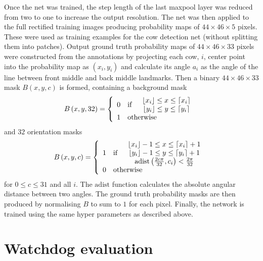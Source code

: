 \documentclass{IET}
\begin{document}
Once the net was trained, the step length of the last maxpool layer was reduced from two to one to increase the output resolution. The net was then applied to the full rectified training images producing probability maps of $44\times 46\times 5$ pixels. These were used as training examples for the cow detection net (without splitting them into patches). Output ground truth probability maps of $44\times 46\times 33$ pixels were constructed from the annotations by projecting each cow, $i$, center point into the probability map as $\left( x_i, y_i \right)$ and calculate its angle $a_i$ as the angle of the line between front middle and back middle landmarks. Then a binary $44\times 46\times 33$ mask $B\left( x, y, c \right)$ is formed, containing a background mask
\begin{equation}
B\left( x, y, 32 \right) = \left\lbrace
\begin{array}{clc}
0 & \text{if} &
\begin{array}{c}
 \lfloor x_i \rfloor \leq x \leq \lceil x_i \rceil \\
 \lfloor y_i \rfloor \leq y \leq \lceil y_i \rceil
\end{array}
\\
1 & \multicolumn{2}{l}{\text{otherwise}}
\end{array}
\right.
\end{equation}
and $32$ orientation masks
\begin{equation}
B\left( x, y, c \right) = \left\lbrace
\begin{array}{clc}
1 & \text{if} &
\begin{array}{c}
 \lfloor x_i \rfloor-1 \leq x \leq \lceil x_i \rceil+1 \\
 \lfloor y_i \rfloor-1 \leq y \leq \lceil y_i \rceil+1 \\
 \mathrm{adist}\left(\frac{2c\pi}{32}, c_i\right) < \frac{2\pi}{32} \\
\end{array}
\\
0 & \multicolumn{2}{l}{\text{otherwise}}
\end{array}
\right.
\end{equation}
for $0\leq c \leq 31$ and all $i$. The $\mathrm{adist}$ function calculates the absolute angular distance between two angles. The ground truth probability masks are then produced by normalising $B$ to sum to $1$ for each pixel. Finally, the network is trained using the same hyper parameters as described above.

\section{Watchdog evaluation}
\end{document}
